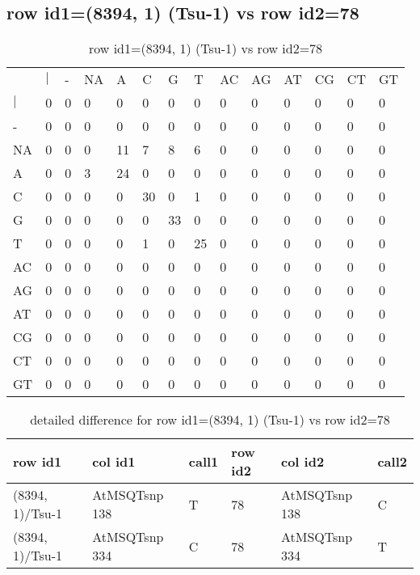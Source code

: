 \subsection{row id1=(8394, 1) (Tsu-1) vs row id2=78}
\begin{center}
\begin{longtable}{|l|l|l|l|l|l|l|l|l|l|l|l|l|l|}
\caption{row id1=(8394, 1) (Tsu-1) vs row id2=78} \label{table_dm456}\\
\hline
\\
\hline
&$|$&-&NA&A&C&G&T&AC&AG&AT&CG&CT&GT\\
$|$&0&0&0&0&0&0&0&0&0&0&0&0&0\\
-&0&0&0&0&0&0&0&0&0&0&0&0&0\\
NA&0&0&0&11&7&8&6&0&0&0&0&0&0\\
A&0&0&3&24&0&0&0&0&0&0&0&0&0\\
C&0&0&0&0&30&0&1&0&0&0&0&0&0\\
G&0&0&0&0&0&33&0&0&0&0&0&0&0\\
T&0&0&0&0&1&0&25&0&0&0&0&0&0\\
AC&0&0&0&0&0&0&0&0&0&0&0&0&0\\
AG&0&0&0&0&0&0&0&0&0&0&0&0&0\\
AT&0&0&0&0&0&0&0&0&0&0&0&0&0\\
CG&0&0&0&0&0&0&0&0&0&0&0&0&0\\
CT&0&0&0&0&0&0&0&0&0&0&0&0&0\\
GT&0&0&0&0&0&0&0&0&0&0&0&0&0\\
\hline
\end{longtable}
\end{center}

\begin{center}
\begin{longtable}{|l|l|l|l|l|l|}
\caption{detailed difference for row id1=(8394, 1) (Tsu-1) vs row id2=78} \label{table_dm457}\\
\hline
row id1&col id1&call1&row id2&col id2&call2\\
\hline
(8394, 1)/Tsu-1&AtMSQTsnp 138&T&78&AtMSQTsnp 138&C\\
(8394, 1)/Tsu-1&AtMSQTsnp 334&C&78&AtMSQTsnp 334&T\\
\hline
\end{longtable}
\end{center}

